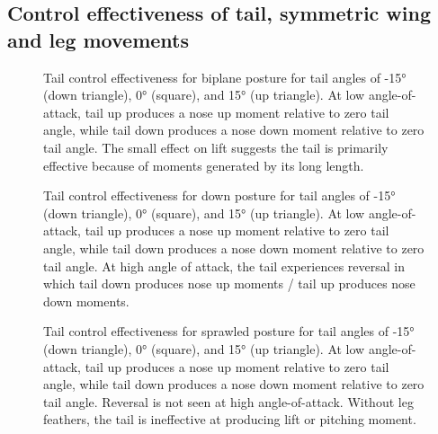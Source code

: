\subsection{Control effectiveness of tail, symmetric wing and leg movements}
\begin{figure}
\caption{Tail control effectiveness for biplane posture for tail angles of \ang{-15} (down triangle), \ang{0} (square), and \ang{+15} (up triangle).  At low angle-of-attack, tail up produces a nose up moment relative to zero tail angle, while tail down produces a nose down moment relative to zero tail angle.  The small effect on lift suggests the tail is primarily effective because of moments generated by its long length.}
\end{figure}
\begin{figure}
\caption{Tail control effectiveness for down posture for tail angles of \ang{-15} (down triangle), \ang{0} (square), and \ang{+15} (up triangle).  At low angle-of-attack, tail up produces a nose up moment relative to zero tail angle, while tail down produces a nose down moment relative to zero tail angle.  At high angle of attack, the tail experiences reversal in which tail down produces nose up moments / tail up produces nose down moments.}
\end{figure}
\begin{figure}
\caption{Tail control effectiveness for sprawled posture for tail angles of \ang{-15} (down triangle), \ang{0} (square), and \ang{+15} (up triangle).  At low angle-of-attack, tail up produces a nose up moment relative to zero tail angle, while tail down produces a nose down moment relative to zero tail angle.  Reversal is not seen at high angle-of-attack.  Without leg feathers, the tail is ineffective at producing lift or pitching moment.}
\end{figure}
